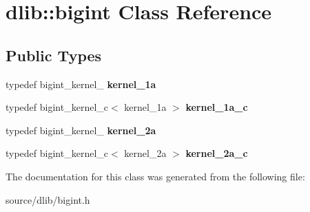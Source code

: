 \hypertarget{classdlib_1_1bigint}{
\section{dlib::bigint Class Reference}
\label{classdlib_1_1bigint}
}
\subsection*{Public Types}
\begin{DoxyCompactItemize}
\item 
\hypertarget{classdlib_1_1bigint_ab2510bc3838b7287df5c41af8e51b1b1}{
typedef bigint\_\-kernel\_ {\bfseries kernel\_\-1a}}
\label{classdlib_1_1bigint_ab2510bc3838b7287df5c41af8e51b1b1}

\item 
\hypertarget{classdlib_1_1bigint_a28e0e3d8acfc1dd2b39dffa27ba7d6cf}{
typedef bigint\_\-kernel\_\-c$<$ kernel\_\-1a $>$ {\bfseries kernel\_\-1a\_\-c}}
\label{classdlib_1_1bigint_a28e0e3d8acfc1dd2b39dffa27ba7d6cf}

\item 
\hypertarget{classdlib_1_1bigint_a3c66aa0ba3b40a128e75747636547257}{
typedef bigint\_\-kernel\_ {\bfseries kernel\_\-2a}}
\label{classdlib_1_1bigint_a3c66aa0ba3b40a128e75747636547257}

\item 
\hypertarget{classdlib_1_1bigint_a559c8024eab63ce144c0ec4ef5eb000f}{
typedef bigint\_\-kernel\_\-c$<$ kernel\_\-2a $>$ {\bfseries kernel\_\-2a\_\-c}}
\label{classdlib_1_1bigint_a559c8024eab63ce144c0ec4ef5eb000f}

\end{DoxyCompactItemize}


The documentation for this class was generated from the following file:\begin{DoxyCompactItemize}
\item 
source/dlib/bigint.h\end{DoxyCompactItemize}
